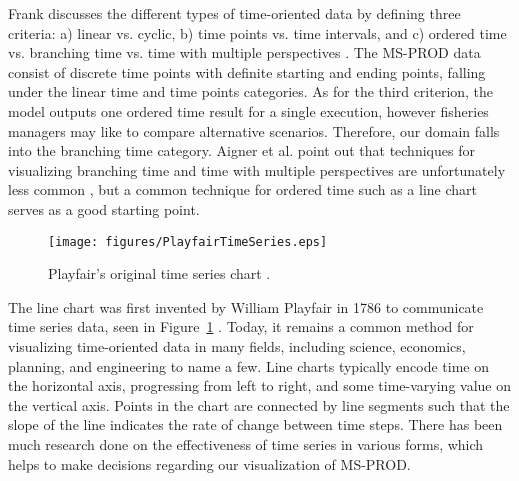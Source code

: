 \documentclass{article}
\begin{document}
Frank discusses the different types of time-oriented data by defining three criteria: a) linear vs. cyclic, b) time points vs. time intervals, and c) ordered time vs. branching time vs. time with multiple perspectives \cite{frank98times}.  The MS-PROD data consist of discrete time points with definite starting and ending points, falling under the linear time and time points categories.  As for the third criterion, the model outputs one ordered time result for a single execution, however fisheries managers may like to compare alternative scenarios.  Therefore, our domain falls into the branching time category.  Aigner et al. point out that techniques for visualizing branching time and time with multiple perspectives are unfortunately less common \cite{Aigner08visualmethods}, but a common technique for ordered time such as a line chart serves as a good starting point.

\begin{figure}[htb]
	\centering
	\texttt{[image: figures/PlayfairTimeSeries.eps]}
	\caption{Playfair's original time series chart \cite{playfair}.}
	\label{fig:playfair}
\end{figure}

The line chart was first invented by William Playfair in 1786 to communicate time series data, seen in Figure~\ref{fig:playfair} \cite{playfair}.  Today, it remains a common method for visualizing time-oriented data in many fields, including science, economics, planning, and engineering to name a few.  Line charts typically encode time on the horizontal axis, progressing from left to right, and some time-varying value on the vertical axis.  Points in the chart are connected by line segments such that the slope of the line indicates the rate of change between time steps.  There has been much research done on the effectiveness of time series in various forms, which helps to make decisions regarding our visualization of MS-PROD.


\end{document}
